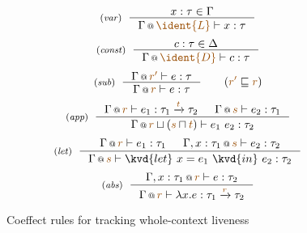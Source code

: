 
\begin{figure}[t]
\begin{equation*}
\tyrule{var}
  {x : \tau \in \Gamma}
  {\coctx{\Gamma}{\aclrd{\ident{L} }} \vdash x : \tau }
\end{equation*}
\begin{equation*}
\tyrule{const}
  {c : \tau \in \Delta}
  {\coctx{\Gamma}{ \aclrd{\ident{D}} } \vdash c : \tau }
\end{equation*}
\begin{equation*}
\tyrule{sub}
  {\coctx{\Gamma}{\aclrd{r'}} \vdash e : \tau }
  {\coctx{\Gamma}{\aclrd{r}} \vdash e : \tau }\quad\quad(\aclrd{r'} \sqsubseteq \aclrd{r})
\end{equation*}
\begin{equation*}
\tyrule{app}
  {\coctx{\Gamma}{\aclrd{r}} \vdash e_1 : \tau_1 \xrightarrow{\aclrd{t}} \tau_2 &
   \coctx{\Gamma}{\aclrd{s}} \vdash e_2 : \tau_1 }
  {\coctx{\Gamma}{\aclrd{r} \sqcup (\aclrd{s} \sqcap \aclrd{t})} \vdash e_1~e_2 : \tau_2}
\end{equation*}
\begin{equation*}
\tyrule{let}
  { \coctx{\Gamma}{\aclrd{r}} \vdash e_1 : \tau_1 &
    \coctx{\Gamma, x:\tau_1}{\aclrd{s}} \vdash e_2 : \tau_2}
  {\coctx{\Gamma}{\aclrd{s}} \vdash \kvd{let}~x=e_1~\kvd{in}~e_2 : \tau_2 }
\end{equation*}
\begin{equation*}
\tyrule{abs}
  {\coctx{\Gamma, x:\tau_1}{\aclrd{r}} \vdash e : \tau_2}
  {\coctx{\Gamma}{\aclrd{r}} \vdash \lambda x.e : \tau_1 \xrightarrow{\aclrd{r}} \tau_2 }
\end{equation*}
\vspace{-0.9em}

\caption{Coeffect rules for tracking whole-context liveness}
\label{fig:applications-flat-liveness}
\vspace{-1.2em}
\end{figure}


